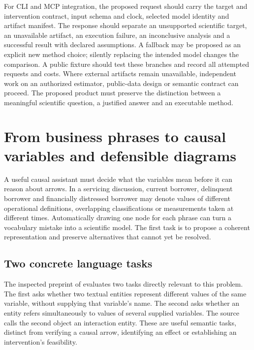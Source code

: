 For CLI and MCP integration, the proposed request should carry the target and intervention contract, input schema and clock, selected model identity and artifact manifest. The response should separate an unsupported scientific target, an unavailable artifact, an execution failure, an inconclusive analysis and a successful result with declared assumptions. A fallback may be proposed as an explicit new method choice; silently replacing the intended model changes the comparison. A public fixture should test these branches and record all attempted requests and costs. Where external artifacts remain unavailable, independent work on an authorized estimator, public-data design or semantic contract can proceed. The proposed product must preserve the distinction between a meaningful scientific question, a justified answer and an executable method.


\section[From business phrases to causal variables]{From business phrases to causal variables and defensible diagrams}
\label{sec:exec28-cm}

A useful causal assistant must decide what the variables mean before it can reason about arrows. In a servicing discussion, current borrower, delinquent borrower and financially distressed borrower may denote values of different operational definitions, overlapping classifications or measurements taken at different times. Automatically drawing one node for each phrase can turn a vocabulary mistake into a scientific model. The first task is to propose a coherent representation and preserve alternatives that cannot yet be resolved.

\subsection{Two concrete language tasks}

The inspected preprint of \citet{exec28_cm_razouk} evaluates two tasks directly relevant to this problem. The first asks whether two textual entities represent different values of the same variable, without supplying that variable's name. The second asks whether an entity refers simultaneously to values of several supplied variables. The source calls the second object an interaction entity. These are useful semantic tasks, distinct from verifying a causal arrow, identifying an effect or establishing an intervention's feasibility.


